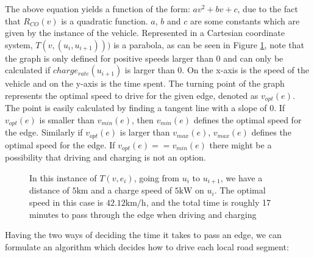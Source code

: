 The above equation yields a function of the form: $av^2 + bv + c$, due to the fact that $R_{CO}(v)$ is a quadratic function. $a$, $b$ and $c$ are some constants which are given by the instance of the vehicle. Represented in a Cartesian coordinate system, $T(v,(u_i, u_{i+1})))$ is a parabola, as can be seen in Figure \ref{fig:graph}, note that the graph is only defined for positive speeds larger than $0$ and can only be calculated if $charge_{rate}(u_{i+1})$ is larger than $0$. On the x-axis is the speed of the vehicle and on the y-axis is the time spent. The turning point of the graph represents the optimal speed to drive for the given edge, denoted as $v_{opt}(e)$. The point is easily calculated by finding a tangent line with a slope of $0$. If $v_{opt}(e)$ is smaller than $v_{min}(e)$, then $v_{min}(e)$ defines the optimal speed for the edge. Similarly if $v_{opt}(e)$ is larger than $v_{max}(e)$, $v_{max}(e)$ defines the optimal speed for the edge. If $v_{opt}(e) == v_{min}(e)$ there might be a possibility that driving and charging is not an option. 

\begin{figure}[!htb]
\label{fig:graph}
% 
\caption{In this instance of $T(v,e_i)$, going from $u_i$ to $u_{i+1}$, we have a distance of $5 \si{\km}$ and a charge speed of $5 \si{\kW}$ on $u_i$. The optimal speed in this case is $42.12\si{\km\per\hour}$, and the total time is roughly 17 minutes to pass through the edge when driving and charging}
\end{figure}
Having the two ways of deciding the time it takes to pass an edge, we can formulate an algorithm which decides how to drive each local road segment:

